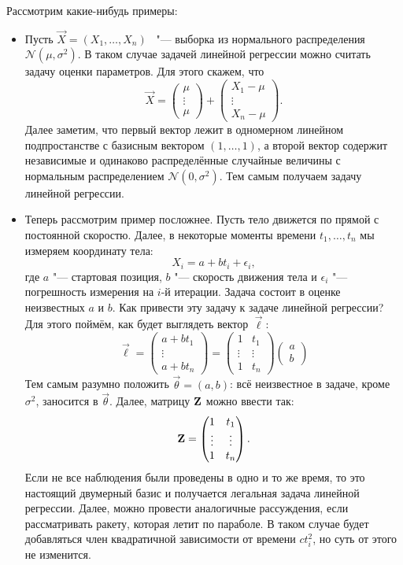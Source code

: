 Рассмотрим какие-нибудь примеры:
\begin{itemize}
	\item Пусть $\vec{X} = (X_{1}, \ldots, X_{n})$  "--- выборка из нормального распределения $\mathcal{N}(\mu, \sigma^{2})$. В таком случае задачей линейной регрессии можно считать задачу оценки параметров. Для этого скажем, что
	\[
		\vec{X} = \begin{pmatrix}
			\mu \\ \vdots \\ \mu
		\end{pmatrix}
		+
		\begin{pmatrix}
			X_{1} - \mu \\ \vdots \\ X_{n} - \mu
		\end{pmatrix}.
	\]
	Далее заметим, что первый вектор лежит в одномерном линейном подпростанстве с базисным вектором $(1, \ldots, 1)$, а второй вектор содержит независимые и одинаково распределённые случайные величины с нормальным распределением $\mathcal{N}(0, \sigma^{2})$. Тем самым получаем задачу линейной регрессии.

	\item Теперь рассмотрим пример посложнее. Пусть тело движется по прямой с постоянной скоростю. Далее, в некоторые моменты времени $t_{1}, \ldots, t_{n}$ мы измеряем координату тела:
	\[
		X_{i} = a + bt_{i} + \epsilon_{i},
	\]
	где $a$ "--- стартовая позиция, $b$ "--- скорость движения тела и $\epsilon_{i}$ "--- погрешность измерения на $i$-й итерации. Задача состоит в оценке неизвестных $a$ и $b$. Как привести эту задачу к задаче линейной регрессии? Для этого поймём, как будет выглядеть вектор $\vec{\ell}$:
	\[
		\vec{\ell} = \begin{pmatrix}
			a + bt_{1} \\ \vdots \\ a + bt_{n}
		\end{pmatrix}
		= \begin{pmatrix}
			1 & t_{1} \\ \vdots & \vdots \\ 1 & t_{n}
		\end{pmatrix}
		\begin{pmatrix}
			a \\ b
		\end{pmatrix}
	\]
	Тем самым разумно положить $\vec{\theta} = (a, b)$: всё неизвестное в задаче, кроме $\sigma^{2}$, заносится в $\vec{\theta}$. Далее, матрицу $\mathbf{Z}$ можно ввести так:
	\[
		\mathbf{Z} = \begin{pmatrix}
			1 & t_{1} \\ \vdots & \vdots \\ 1 & t_{n}
		\end{pmatrix}.
	\]
	Если не все наблюдения были проведены в одно и то же время, то это настоящий двумерный базис и получается легальная задача линейной регрессии. Далее, можно провести аналогичные рассуждения, если рассматривать ракету, которая летит по параболе. В таком случае будет добавляться член квадратичной зависимости от времени $ct_{i}^{2}$, но суть от этого не изменится.
\end{itemize}

